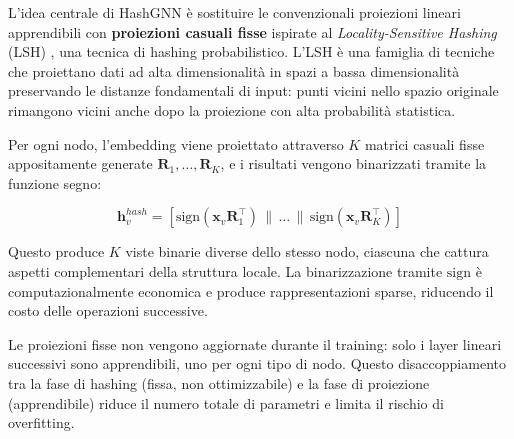 L'idea centrale di HashGNN è sostituire le convenzionali proiezioni lineari apprendibili con \textbf{proiezioni casuali fisse} ispirate al \textit{Locality-Sensitive Hashing} (LSH) \cite{indyk1998approximate}, una tecnica di hashing probabilistico. L'LSH è una famiglia di tecniche che proiettano dati ad alta dimensionalità in spazi a bassa dimensionalità preservando le distanze fondamentali di input: punti vicini nello spazio originale rimangono vicini anche dopo la proiezione con alta probabilità statistica.

Per ogni nodo, l'embedding viene proiettato attraverso $K$ matrici casuali fisse appositamente generate $\mathbf{R}_1, \dots, \mathbf{R}_K$, e i risultati vengono binarizzati tramite la funzione segno:

\begin{equation}
\mathbf{h}_v^{hash} = \left[\text{sign}(\mathbf{x}_v \mathbf{R}_1^\top) \,\|\, \dots \,\|\, \text{sign}(\mathbf{x}_v \mathbf{R}_K^\top)\right]
\end{equation}

Questo produce $K$ viste binarie diverse dello stesso nodo, ciascuna che cattura aspetti complementari della struttura locale. La binarizzazione tramite $\text{sign}$ è computazionalmente economica e produce rappresentazioni sparse, riducendo il costo delle operazioni successive.

Le proiezioni fisse non vengono aggiornate durante il training: solo i layer lineari successivi sono apprendibili, uno per ogni tipo di nodo. Questo disaccoppiamento tra la fase di hashing (fissa, non ottimizzabile) e la fase di proiezione (apprendibile) riduce il numero totale di parametri e limita il rischio di overfitting.

